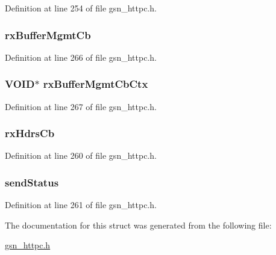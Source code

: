 Definition at line 254 of file gsn\_\-httpc.h.

\hypertarget{a00093_ad0f2e9fb5c7aa9fe8b272479e3ea415b}{
\subsubsection[{rxBufferMgmtCb}]{ {\bf rxBufferMgmtCb}}}
\label{a00093_ad0f2e9fb5c7aa9fe8b272479e3ea415b}


Definition at line 266 of file gsn\_\-httpc.h.

\hypertarget{a00093_a8ccdb1d001da18b5348d6b9c43f9d51f}{
\subsubsection[{rxBufferMgmtCbCtx}]{\setlength{\rightskip}{0pt plus 5cm}VOID$\ast$ {\bf rxBufferMgmtCbCtx}}}
\label{a00093_a8ccdb1d001da18b5348d6b9c43f9d51f}


Definition at line 267 of file gsn\_\-httpc.h.

\hypertarget{a00093_a21342c1a913caebce98cfd93751f3511}{
\subsubsection[{rxHdrsCb}]{ {\bf rxHdrsCb}}}
\label{a00093_a21342c1a913caebce98cfd93751f3511}


Definition at line 260 of file gsn\_\-httpc.h.

\hypertarget{a00093_a83c62158f40d2e96e39eec76f840d403}{
\subsubsection[{sendStatus}]{ {\bf sendStatus}}}
\label{a00093_a83c62158f40d2e96e39eec76f840d403}


Definition at line 261 of file gsn\_\-httpc.h.



The documentation for this struct was generated from the following file:\begin{DoxyCompactItemize}
\item 
\hyperlink{a00507}{gsn\_\-httpc.h}\end{DoxyCompactItemize}
